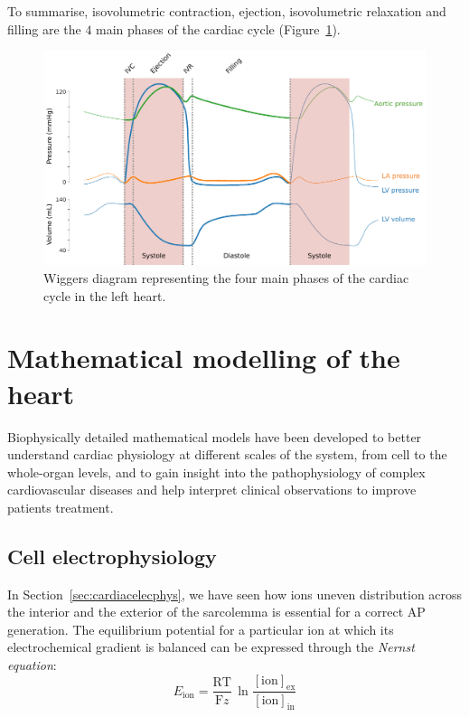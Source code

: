 \vspace{0.2cm}
To summarise, isovolumetric contraction, ejection, isovolumetric relaxation and filling are the $4$ main phases of the cardiac cycle (Figure~\ref{fig:wiggersdiagram}).

\begin{figure}[!ht]
    \myfloatalign
    \includegraphics[width=\textwidth]{figures/chapter01/wiggers_diagram.pdf}
    \caption{Wiggers diagram representing the four main phases of the cardiac cycle in the left heart.}
    \label{fig:wiggersdiagram}
\end{figure}


%
%
%
\section{Mathematical modelling of the heart}
Biophysically detailed mathematical models have been developed to better understand cardiac physiology at different scales of the system, from cell to the whole-organ levels, and to gain insight into the pathophysiology of complex cardiovascular diseases and help interpret clinical observations to improve patients treatment.


%
%
%
\subsection{Cell electrophysiology}
In Section~\ref{sec:cardiacelecphys}, we have seen how ions uneven distribution across the interior and the exterior of the sarcolemma is essential for a correct AP generation. The equilibrium potential for a particular ion at which its electrochemical gradient is balanced can be expressed through the \textit{Nernst equation}:
%
\begin{equation}\label{eq:nernsteq}
    E_{\textrm{ion}}=\frac{\textrm{R}\textrm{T}}{\textrm{F}z}\,\ln{\frac{[\textrm{ion}]_{\textrm{ex}}}{[\textrm{ion}]_{\textrm{in}}}}
\end{equation}

